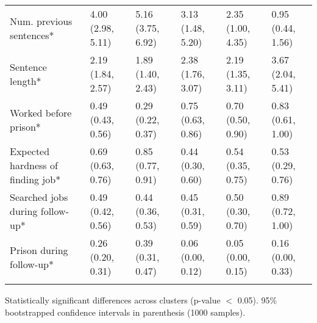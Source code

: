 \begin{table}[htp]
\begin{threeparttable}
\begin{tabular}{llllll}
  \quad Num. previous sentences* & 4.00 (2.98, 5.11) & 5.16 (3.75, 6.92) & 3.13 (1.48, 5.20) & 2.35 (1.00, 4.35) & 0.95 (0.44, 1.56) \\ 
  \quad Sentence length* & 2.19 (1.84, 2.57) & 1.89 (1.40, 2.43) & 2.38 (1.76, 3.07) & 2.19 (1.35, 3.11) & 3.67 (2.04, 5.41) \\ 
  \quad Worked before prison* & 0.49 (0.43, 0.56) & 0.29 (0.22, 0.37) & 0.75 (0.63, 0.86) & 0.70 (0.50, 0.90) & 0.83 (0.61, 1.00) \\ 
  \quad Expected hardness of finding job* & 0.69 (0.63, 0.76) & 0.85 (0.77, 0.91) & 0.44 (0.30, 0.60) & 0.54 (0.35, 0.75) & 0.53 (0.29, 0.76) \\ 
  \quad Searched jobs during follow-up* & 0.49 (0.42, 0.56) & 0.44 (0.36, 0.53) & 0.45 (0.31, 0.59) & 0.50 (0.30, 0.70) & 0.89 (0.72, 1.00) \\ 
  \quad Prison during follow-up* & 0.26 (0.20, 0.31) & 0.39 (0.31, 0.47) & 0.06 (0.00, 0.12) & 0.05 (0.00, 0.15) & 0.16 (0.00, 0.33) \\ 
  \addlinespace
\addlinespace
\addlinespace
\hline
\addlinespace
\end{tabular}
\begin{tablenotes}
\scriptsize
    \item * Statistically significant differences across clusters (p-value $<$ 0.05). 95\% bootstrapped confidence intervals in parenthesis (1000 samples).
\end{tablenotes}
\end{threeparttable}
\end{table}
